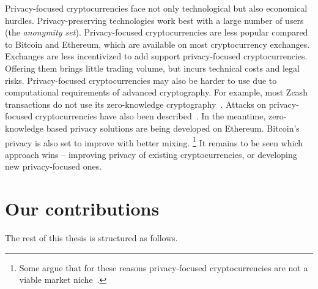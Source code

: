 Privacy-focused cryptocurrencies face not only technological but also economical hurdles.
Privacy-preserving technologies work best with a large number of users (the \textit{anonymity set}).
Privacy-focused cryptocurrencies are less popular compared to Bitcoin and Ethereum, which are available on most cryptocurrency exchanges.
Exchanges are less incentivized to add support privacy-focused cryptocurrencies.
Offering them brings little trading volume, but incurs technical costs and legal risks.
Privacy-focused cryptocurrencies may also be harder to use due to computational requirements of advanced cryptography.
For example, most Zcash transactions do not use its zero-knowledge cryptography~\cite{Quesnelle2017, Biryukov2019c}.
Attacks on privacy-focused cryptocurrencies have also been described~\cite{Moeser2018, Biryukov2019e, Tramer2020}.
In the meantime, zero-knowledge based privacy solutions are being developed on Ethereum.
Bitcoin's privacy is also set to improve with better mixing.
\footnote{Some argue that for these reasons privacy-focused cryptocurrencies are not a viable market niche~\cite{Gentry2019}.}
It remains to be seen which approach wins -- improving privacy of existing cryptocurrencies, or developing new privacy-focused ones.



\section{Our contributions}

The rest of this thesis is structured as follows.

